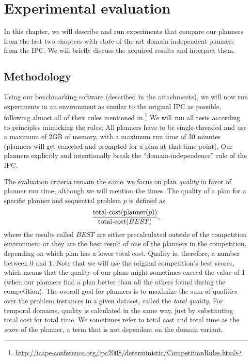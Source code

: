 \chapter{Experimental evaluation}

In this chapter, we will describe and run experiments
that compare our planners from the last two chapters
with state-of-the-art domain-independent planners from the IPC.
We will briefly discuss the acquired results and interpret them.

\section{Methodology}

Using our benchmarking software (described in the attachments), we will now run experiments in an
environment as similar to the original
IPC as possible, following almost all of their rules mentioned in.\footnote{\url{http://icaps-conference.org/ipc2008/deterministic/CompetitionRules.html}}
We will run all tests according to principles mimicking the rules;
All planners have to be single-threaded and use a maximum of 2GB of memory, with a maximum run time of 30 minutes (planners will
get canceled and prompted for a plan at that time point).
Our planners explicitly and intentionally break the ``domain-independence'' rule of the IPC.

The evaluation criteria remain the same:
we focus on plan \textit{quality} in favor of planner run time,
although we will mention the times.
The quality of a plan for a specific planner and sequential problem $p$ is defined as
$$\frac{\textrm{total-cost}(\textrm{planner}(p))}{\textrm{total-cost}(BEST)},$$
where the results called $BEST$
are either precalculated outside of the competition environment or they are the best result of one of the planners in the competition, depending on which plan has a lower total cost.
Quality is, therefore, a number between $0$ and $1$.
Note that we will use the original competition's best scores,
which means that the quality of our plans
might sometimes exceed the value of 1
(when our planners find a plan better than all the others found during the competition).
The overall goal for planners is to maximize the sum of qualities over the problem instances in a given dataset, called the \textit{total quality}.
For temporal domains, quality is calculated in the same way, just by substituting total cost
for total time. We sometimes refer to total cost and total time as the \textit{score} of the planner, a term that is not dependent on the domain variant.

